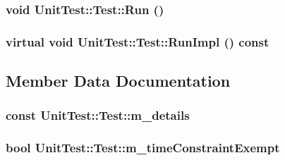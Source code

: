 \hypertarget{class_unit_test_1_1_test_8b266c253b945d9552c56012a96a55a2}{
\subsubsection[{Run}]{\setlength{\rightskip}{0pt plus 5cm}void UnitTest::Test::Run ()}}
\label{class_unit_test_1_1_test_8b266c253b945d9552c56012a96a55a2}


\hypertarget{class_unit_test_1_1_test_faf8822de5354d2f1027c7ea2f7a1030}{
\subsubsection[{RunImpl}]{\setlength{\rightskip}{0pt plus 5cm}virtual void UnitTest::Test::RunImpl () const}}
\label{class_unit_test_1_1_test_faf8822de5354d2f1027c7ea2f7a1030}




\subsection{Member Data Documentation}
\hypertarget{class_unit_test_1_1_test_e990920e048b41738394132fe985c452}{
\subsubsection[{m\_\-details}]{ const {\bf UnitTest::Test::m\_\-details}}}
\label{class_unit_test_1_1_test_e990920e048b41738394132fe985c452}


\hypertarget{class_unit_test_1_1_test_a9da2047fed156c74d97c89c4beb7663}{
\subsubsection[{m\_\-timeConstraintExempt}]{\setlength{\rightskip}{0pt plus 5cm}bool {\bf UnitTest::Test::m\_\-timeConstraintExempt}}}
\label{class_unit_test_1_1_test_a9da2047fed156c74d97c89c4beb7663}


